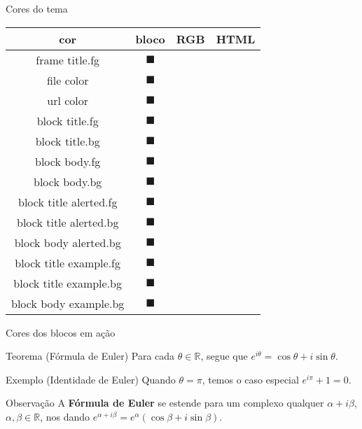 \documentclass{beamer}
\newcommand{\extractcolorcode}[2]{\extractcolorspecs{#2}{\auxmodel}{\auxcolor} \convertcolorspec{\auxmodel}{\auxcolor}{#1}\printcol \printcol}
\newcommand{\linhadecor}[1]{{\color{#1}#1} & {\color{#1}$\blacksquare$} & \extractcolorcode{RGB}{#1} & \extractcolorcode{HTML}{#1}}
\begin{document}
\begin{frame}{Cores do tema}

  \begin{center}
    \begin{tabular}{cccc}
      \hline
      cor & bloco & RGB & HTML \\
      \hline
      \linhadecor{frame title.fg} \\
      \linhadecor{file color} \\
      \linhadecor{url color} \\
      \linhadecor{block title.fg} \\
      \linhadecor{block title.bg} \\
      \linhadecor{block body.fg} \\
      \linhadecor{block body.bg} \\
      \linhadecor{block title alerted.fg} \\
      \linhadecor{block title alerted.bg} \\
      \linhadecor{block body alerted.bg} \\
      \linhadecor{block title example.fg} \\
      \linhadecor{block title example.bg} \\
      \linhadecor{block body example.bg} \\
      \hline
    \end{tabular}
  \end{center}

\end{frame}

\begin{frame}{Cores dos blocos em ação}

  \begin{block}{Teorema (Fórmula de Euler)}
    Para cada $\theta\in \mathbb{R}$, segue que $e^{i\theta} = \cos\theta + i\sin\theta.$
  \end{block}
  
  \begin{exampleblock}{Exemplo (Identidade de Euler)}
    Quando $\theta = \pi$, temos o caso especial $e^{i\pi} + 1 = 0.$
  \end{exampleblock}
  
  \begin{alertblock}{Observação}
    A \textbf{Fórmula de Euler} se estende para um complexo qualquer $\alpha + i\beta$, $\alpha, \beta\in \mathbb{R}$, nos dando 
    $ e^{\alpha + i\beta} = e^{\alpha}(\cos\beta + i\sin\beta).
    $
  \end{alertblock}
\end{frame}
\end{document}

